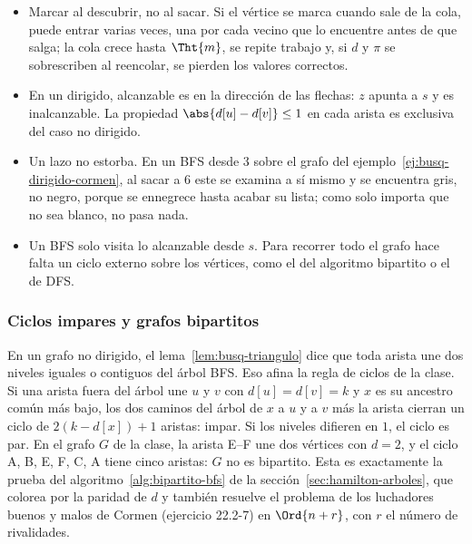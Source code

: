 \documentclass[11pt,letterpaper]{article}
\begin{document}
\begin{ojo}
  \begin{itemize}[leftmargin=1.2em, itemsep=0.15em]
    \item Marcar al descubrir, no al sacar. Si el vértice se marca
      cuando sale de la cola, puede entrar varias veces, una por cada
      vecino que lo encuentre antes de que salga; la cola crece hasta
      $\Tht{m}$, se repite trabajo y, si $d$ y $\pi$ se sobrescriben
      al reencolar, se pierden los valores correctos.
    \item En un dirigido, alcanzable es en la dirección de las
      flechas: $z$ apunta a $s$ y es inalcanzable. La propiedad
      $\abs{d[u] - d[v]} \leq 1$ en cada arista es exclusiva del caso
      no dirigido.
    \item Un lazo no estorba. En un BFS desde $3$ sobre el grafo del
      ejemplo~\ref{ej:busq-dirigido-cormen}, al sacar a $6$ este se
      examina a sí mismo y se encuentra gris, no negro, porque se
      ennegrece hasta acabar su lista; como solo importa que no sea
      blanco, no pasa nada.
    \item Un BFS solo visita lo alcanzable desde $s$. Para recorrer
      todo el grafo hace falta un ciclo externo sobre los vértices,
      como el del algoritmo bipartito o el de DFS.
  \end{itemize}
\end{ojo}

\subsubsection*{Ciclos impares y grafos bipartitos}

En un grafo no dirigido, el lema~\ref{lem:busq-triangulo} dice que
toda arista une dos niveles iguales o contiguos del árbol BFS. Eso
afina la regla de ciclos de la clase. Si una arista fuera del árbol
une $u$ y $v$ con $d[u] = d[v] = k$ y $x$ es su ancestro común más
bajo, los dos caminos del árbol de $x$ a $u$ y a $v$ más la arista
cierran un ciclo de $2(k - d[x]) + 1$ aristas: impar. Si los niveles
difieren en $1$, el ciclo es par. En el grafo $G$ de la clase, la
arista E--F une dos vértices con $d = 2$, y el ciclo A, B, E, F, C, A
tiene cinco aristas: $G$ no es bipartito. Esta es exactamente la
prueba del algoritmo~\ref{alg:bipartito-bfs} de la
sección~\ref{sec:hamilton-arboles}, que colorea por la paridad de $d$
y también resuelve el problema de los luchadores buenos y malos de
Cormen (ejercicio 22.2-7) en $\Ord{n + r}$, con $r$ el número de
rivalidades.
\end{document}

